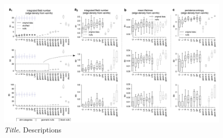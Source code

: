 \begin{figure}[H]
    \centering
    \includegraphics[width=\textwidth,center]{../figures/report/Fig4.png}
    \caption{\label{fig:4}
    \textit{Title}.
    Descriptions
    }
\end{figure}